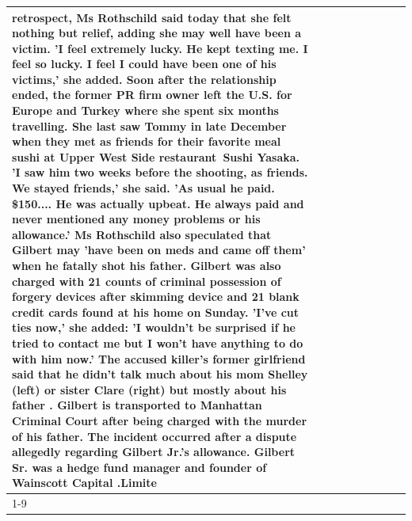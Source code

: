 \begin{table}[H]
\begin{tabular}{lllrlllll}
retrospect, Ms Rothschild said today that she felt nothing but relief, adding she may well have been a victim. 'I feel extremely lucky. He kept texting me. I feel so lucky. I feel I could have been one of his victims,' she added. Soon after the relationship ended, the former PR firm owner left the U.S. for Europe and Turkey where she spent six months  travelling. She last saw Tommy in late December when they met as friends for their favorite meal sushi at Upper West Side restaurant Sushi Yasaka. 'I saw him two weeks before the shooting, as friends. We stayed friends,' she said. 'As usual he paid. \$150.... He was actually upbeat. He always paid and never mentioned any money problems or his allowance.' Ms Rothschild also speculated that Gilbert may 'have been on meds and came off them' when he fatally shot his father. Gilbert was also charged with 21 counts of criminal possession of forgery devices after skimming device and 21 blank credit cards found at his home on Sunday. 'I've cut ties now,' she added: 'I wouldn’t be surprised if he tried to contact me but I won’t have anything to do with him now.' The accused killer's former girlfriend said that he didn't talk much about his mom Shelley (left) or sister Clare (right) but mostly about his father . Gilbert is transported to Manhattan Criminal Court  after being charged with the murder of his father. The incident occurred after a dispute allegedly regarding Gilbert Jr.'s allowance. Gilbert Sr. was a hedge fund manager and founder of Wainscott Capital .Limite \\
\cline{1-9} \cline{2-9}

\end{tabular}
\end{table}
